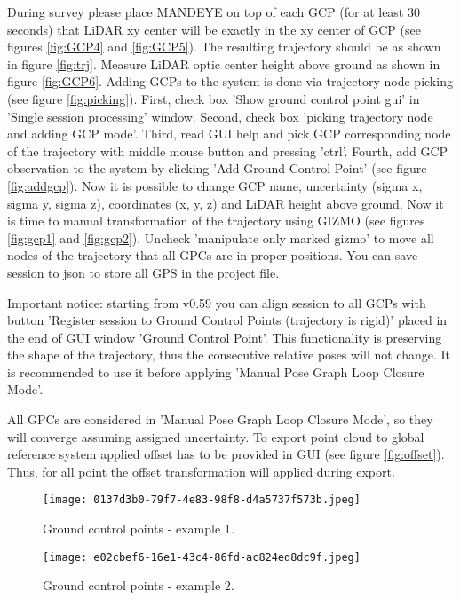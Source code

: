 During survey please place MANDEYE on top of each GCP (for at least 30 seconds) that LiDAR xy center will be exactly in the xy center of GCP (see figures \ref{fig:GCP4} and \ref{fig:GCP5}).
The resulting trajectory should be as shown in figure \ref{fig:trj}.
Measure LiDAR optic center height above ground as shown in figure \ref{fig:GCP6}.
Adding GCPs to the system is done via trajectory node picking (see figure \ref{fig:picking}).
First, check box 'Show ground control point gui' in 'Single session processing' window.
Second, check box 'picking trajectory node and adding GCP mode'.
Third, read GUI help and pick GCP corresponding node of the trajectory with middle mouse button and pressing 'ctrl'.
Fourth, add GCP observation to the system by clicking 'Add Ground Control Point' (see figure \ref{fig:addgcp}).
Now it is possible to change GCP name, uncertainty (sigma x, sigma y, sigma z), coordinates (x, y, z) and LiDAR height above ground.
Now it is time to manual transformation of the trajectory using GIZMO (see figures \ref{fig:gcp1} and \ref{fig:gcp2}). 
Uncheck 'manipulate only marked gizmo' to move all nodes of the trajectory that all GPCs are in proper positions.
You can save session to json to store all GPS in the project file.

Important notice: starting from v0.59 you can align session to all GCPs with button 'Register session to Ground Control Points (trajectory is rigid)' placed in the end of GUI window 'Ground Control Point'.
This functionality is preserving the shape of the trajectory, thus the consecutive relative poses will not change.  
It is recommended to use it before applying 'Manual Pose Graph Loop Closure Mode'.

All GPCs are considered in 'Manual Pose Graph Loop Closure Mode', so they will converge assuming assigned uncertainty. 
To export point cloud to global reference system applied offset has to be provided in GUI (see figure \ref{fig:offset}).
Thus, for all point the offset transformation will applied during export.

\begin{figure}[H]
	\centering
	\texttt{[image: 0137d3b0-79f7-4e83-98f8-d4a5737f573b.jpeg]}
	\caption{Ground control points - example 1.}
	\label{fig:GCP1}
\end{figure}

\begin{figure}[H]
	\centering
	\texttt{[image: e02cbef6-16e1-43c4-86fd-ac824ed8dc9f.jpeg]}
	\caption{Ground control points - example 2.}
	\label{fig:GCP2}
\end{figure}

